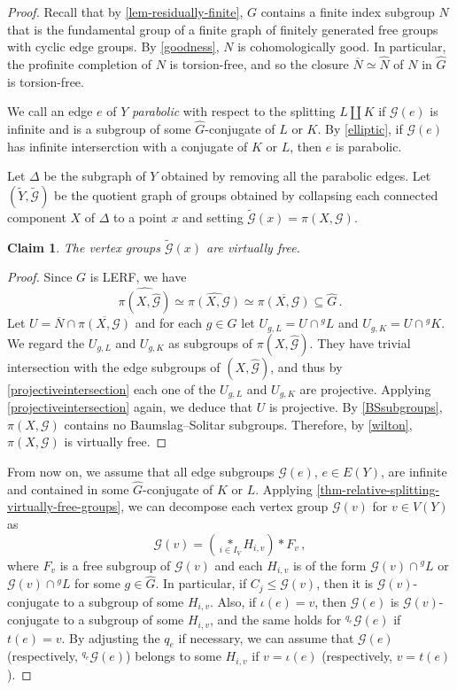 \documentclass[a4paper]{amsart}
\newtheorem{claim}[lem]{Claim}
\theoremstyle{definition}
\theoremstyle{remark}
\newcommand{\G}{\mathcal G}
\begin{document}
\begin{proof}  Recall that by \cref{lem-residually-finite}, \(G\) contains a finite index subgroup \(N\) that is the fundamental group of a finite graph of finitely generated free groups with cyclic edge groups. By \cref{goodness}, \(N\) is cohomologically good. In particular, the profinite completion of \(N\) is torsion-free, and so the closure \(\overline{N} \simeq \widehat{N}\) of \(N\) in \(\widehat{G}\) is torsion-free.

We call an edge \(e\) of \(Y\) \emph{parabolic} with respect to the splitting \(L \amalg K\) if \(\G(e)\) is infinite and is a subgroup of some \(\widehat{G}\)-conjugate of \(L\) or \(K\). By \cref{elliptic}, if \(\G(e)\) has infinite interserction with a conjugate of \(K\) or \(L\), then \(e\) is parabolic. 

Let \(\Delta\) be the subgraph of \(Y\) obtained by removing all the parabolic edges. Let \((\widetilde{Y}, \widetilde{\G})\) be the quotient graph of groups obtained by collapsing each connected component \(X\) of \(\Delta\) to a point \(x\) and setting \(\widetilde{\G}(x) = \pi(X,\G)\).

\begin{claim}\label{claim-after-collapsing} The vertex groups \(\widetilde{\G}(x)\) are virtually free.
\end{claim}
\begin{proof}
Since \(G\) is LERF, we have \[\widehat{\pi(X, \widehat{\G})} \simeq \widehat{\pi(X, \mathcal{G})} \simeq \overline{\pi(X, \mathcal{G})} \subseteq \widehat{G}\,.\] Let \(U = \overline{N} \cap \overline{\pi(X, \mathcal{G})}\) and for each \(g \in G\) let \(U_{g,L} = U \cap {^g L}\) and \(U_{g,K} = U \cap {^gK}\). We regard the \(U_{g,L}\) and \(U_{g,K}\) as subgroups of \(\pi(X,\widehat{\G})\). They have trivial intersection with the edge subgroups of \((X,\widehat{\G})\), and thus by \cref{projectiveintersection} each one of the \(U_{g,L}\) and \(U_{g,K}\) are projective. Applying \cref{projectiveintersection} again, we deduce that \(U\) is projective. By \cref{BSsubgroups}, \(\pi(X,\G)\) contains no Baumslag--Solitar subgroups. Therefore, by \cref{wilton}, \(\pi(X,\G)\) is virtually free.
\end{proof}

From now on, we assume that all edge subgroups \(\G(e)\), \(e \in E(Y)\), are infinite and contained in some \(\widehat{G}\)-conjugate of \(K\) or \(L\). Applying \cref{thm-relative-splitting-virtually-free-groups}, we can decompose each vertex group \(\G(v)\) for \(v \in V(Y)\) as \[\G(v) = \left(\underset{i \in I_V}{\ast} H_{i,v}\right) * F_v\,,\] where \(F_v\) is a free subgroup of \(\G(v)\) and each \(H_{i,v}\) is of the form \(\G(v) \cap {^gL}\) or \(\G(v) \cap {^gL}\) for some \(g \in \widehat{G}\). In particular, if \(C_j \leq \G(v)\), then it is \(\G(v)\)-conjugate to a subgroup of some \(H_{i,v}\). Also, if \(\iota(e) = v\), then \(\G(e)\) is \(\G(v)\)-conjugate to a subgroup of some \(H_{i,v}\), and the same holds for \({^{q_e}\G(e)}\) if \(t(e) = v\). By adjusting the \(q_e\) if necessary, we can assume that \(\G(e)\) (respectively, \({^{q_e}\G(e)}\)) belongs to some \(H_{i,v}\) if \(v = \iota(e)\) (respectively, \(v = t(e)\)).


\end{proof}
\end{document}
